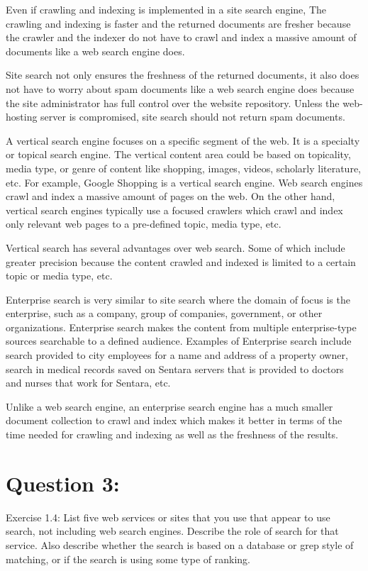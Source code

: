 \documentclass[a4paper, 11pt]{article}
\begin{document}
Even if crawling and indexing is implemented in a site search engine, The crawling and indexing is faster and the returned documents are fresher because the crawler and the indexer do not have to crawl and index a massive amount of documents like a web search engine does.

Site search not only ensures the freshness of the returned documents, it also does not have to worry about spam documents like a web search engine does because the site administrator has full control over the website repository. Unless the web-hosting server is compromised, site search should not return spam documents.

A vertical search engine focuses on a specific segment of the web. It is a specialty or topical search engine. The vertical content area could be based on topicality, media type, or genre of content like shopping, images, videos, scholarly literature, etc. For example, Google Shopping is a vertical search engine. Web search engines crawl and index a massive amount of pages on the web. On the other hand, vertical search engines typically use a focused crawlers which crawl and index only relevant web pages to a pre-defined topic, media type, etc.

Vertical search has several advantages over web search. Some of which include greater precision because the content crawled and indexed is limited to a certain topic or media type, etc.

Enterprise search is very similar to site search where the domain of focus is the enterprise, such as a company, group of companies, government, or other organizations. Enterprise search makes the content from multiple enterprise-type sources searchable to a defined audience. Examples of Enterprise search include search provided to city employees for a name and address of a property owner, search in medical records saved on Sentara servers  that is provided to doctors and nurses that work for Sentara, etc.

Unlike a web search engine, an enterprise search engine has a much smaller document collection to crawl and index which makes it better in terms of the time needed for crawling and indexing as well as the freshness of the results.

\section*{Question 3:}
Exercise 1.4: List five web services or sites that you use that appear to use search, not including
web search engines. Describe the role of search for that service. Also describe
whether the search is based on a database or grep style of matching, or if the search
is using some type of ranking.
\end{document}
